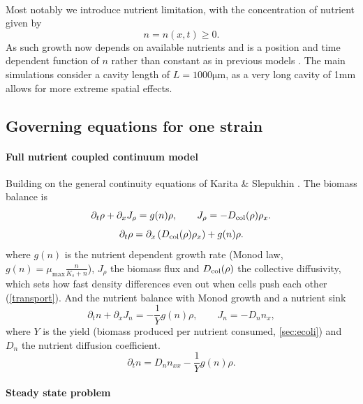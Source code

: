 \documentclass[11pt,a4paper]{report}
\begin{document}
	\\
	Most notably we introduce nutrient limitation, with the concentration of nutrient given by
	\begin{equation}
		n=n(x,t)\ge 0.
	\end{equation}
	As such growth now depends on available nutrients and is a position and time dependent function of $n$ rather than constant as in previous models \cite{Karita}. The main simulations consider a cavity length of $L=1000 \mathrm{\mu m}$, as a very long cavity of 1mm allows for more extreme spatial effects.

\subsection{Governing equations for one strain}
\paragraph{Full nutrient coupled continuum model}
\label{sec:full_model_new}

Building on the general continuity equations of Karita \& Slepukhin \cite{Karita, slepukhin}. The biomass balance is
\begin{equation}
	\partial_t\rho+\partial_xJ_\rho=g(n)\rho,
	\qquad
	J_\rho=-D_{\rm col}(\rho)\rho_x.
	\label{eq:rho_flux_balance}
\end{equation}
\begin{equation}
	{
		\partial_t\rho
		=\partial_x\left(D_{\rm col}(\rho)\rho_x\right)+g(n)\rho.
	}
	\label{eq:rho_pde_new}
\end{equation}
where $g(n)$ is the nutrient dependent growth rate (Monod law, $g(n)=\mu_{\max}\frac{n}{K_s+n}$), $J_\rho$ the biomass flux and $D_{\rm col}(\rho)$ the collective diffusivity, which sets how fast density differences even out when cells push each other (\cref{transport}).
And the nutrient balance with Monod growth and a nutrient sink \cite{Monod}
\begin{equation}
	\partial_t n+\partial_xJ_n=-\frac{1}{Y}g(n)\rho,
	\qquad
	J_n=-D_n n_x,
\end{equation}
where $Y$ is the yield (biomass produced per nutrient consumed, \cref{sec:ecoli}) and $D_n$ the nutrient diffusion coefficient.
\begin{equation}
	{
		\partial_t n=D_n n_{xx}-\frac{1}{Y}g(n)\rho.
	}
	\label{eq:n_pde_new}
\end{equation}
\paragraph{Steady state problem}
\label{sec:steady_problem}
\end{document}
